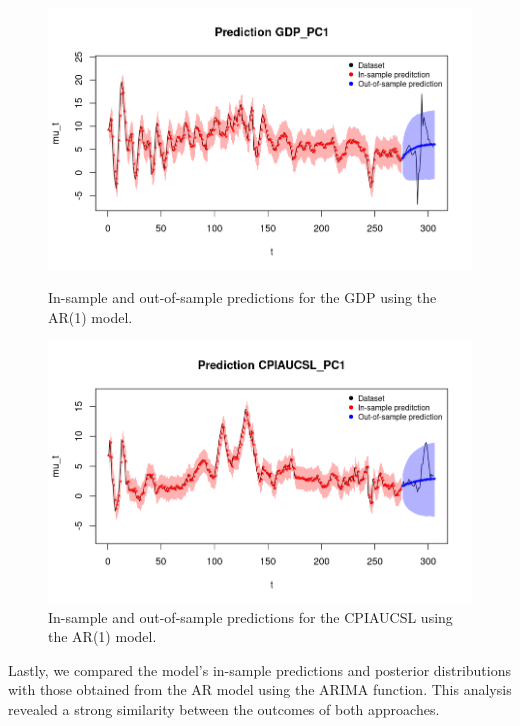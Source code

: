 \begin{figure}[H]
    \centering
    \begin{minipage}{0.49\textwidth}
        \centering
        \includegraphics[width=\textwidth]{images/2-AR/gdp_prediction.png}
        \caption{In-sample and out-of-sample predictions for the GDP using the AR(1) model.}
        \label{fig:AR1_gdp_prediction}
    \end{minipage}\hfill
    \begin{minipage}{0.49\textwidth}
        \centering
        \includegraphics[width=\textwidth]{images/2-AR/infl_prediction.png}
        \caption{In-sample and out-of-sample predictions for the CPIAUCSL using the AR(1) model.}
        \label{fig:AR1_infl_prediction}
    \end{minipage}
\end{figure}
Lastly, we compared the model's in-sample predictions and posterior distributions with those obtained from the AR model using the ARIMA function. This analysis revealed a strong similarity between the outcomes of both approaches.